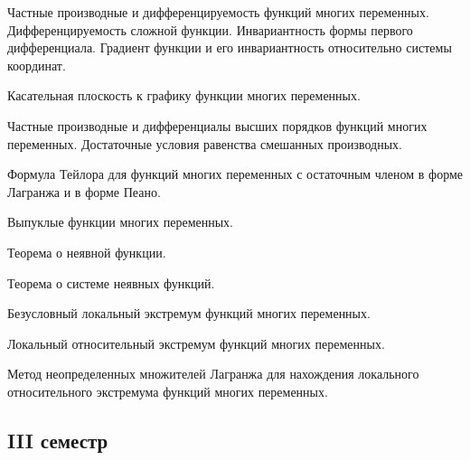 \documentclass[a4paper]{article}
\begin{document}
\begin{nums}{-3}
\item Частные производные и дифференцируемость функций многих переменных. Дифференцируемость сложной функции.
Инвариантность формы первого дифференциала. Градиент функции и его инвариантность относительно системы координат.
\item Касательная плоскость к графику функции многих переменных.
\item Частные производные и дифференциалы высших порядков функций многих переменных. Достаточные условия
равенства смешанных производных.
\item Формула Тейлора для функций многих переменных с остаточным членом в форме Лагранжа и в форме Пеано.
\item Выпуклые функции многих переменных.
\item Теорема о неявной функции.
\item Теорема о системе неявных функций.
\item Безусловный локальный экстремум функций многих переменных.
\item Локальный относительный экстремум функций многих переменных.
\item Метод неопределенных множителей Лагранжа для нахождения локального относительного экстремума функций
      многих переменных.
\end{nums}

\pagebreak

\subsection*{III семестр}
\end{document}
